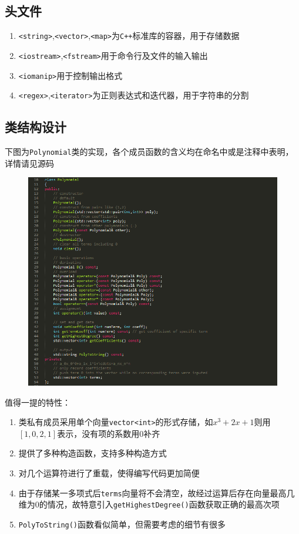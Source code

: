 \documentclass[11pt,UTF8]{ctexart}
\begin{document}
\subsection{头文件}
\begin{enumerate}
	\item \verb'<string>',\verb'<vector>',\verb'<map>'为\verb'C++'标准库的容器，用于存储数据
	\item \verb'<iostream>',\verb'<fstream>'用于命令行及文件的输入输出
	\item \verb'<iomanip>'用于控制输出格式
	\item \verb'<regex>',\verb'<iterator>'为正则表达式和迭代器，用于字符串的分割
\end{enumerate}

\subsection{类结构设计}
\par 下图为\verb'Polynomial'类的实现，各个成员函数的含义均在命名中或是注释中表明，详情请见源码
\begin{figure}[H]
\centering
\includegraphics[width=\linewidth]{pic/class_polynomial.PNG}
\label{Fig:p1}
\end{figure}
\par 值得一提的特性：
\begin{enumerate}
	\item 类私有成员采用单个向量\verb'vector<int>'的形式存储，如$x^3+2x+1$则用$[1,0,2,1]$表示，没有项的系数用$0$补齐
	\item 提供了多种构造函数，支持多种构造方式
	\item 对几个运算符进行了重载，使得编写代码更加简便
	\item 由于存储某一多项式后\verb'terms'向量将不会清空，故经过运算后存在向量最高几维为$0$的情况，故特意引入\verb'getHighestDegree()'函数获取正确的最高次项
	\item \verb'PolyToString()'函数看似简单，但需要考虑的细节有很多
\end{enumerate}
\end{document}

